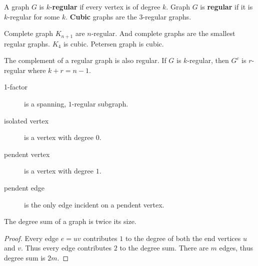 \begin{definition}
	A graph $G$ is $k$-\textbf{regular} if every vertex is of degree $k$. Graph $G$ is \textbf{regular} if it is $k$-regular for some $k$. \textbf{Cubic} graphs are the $3$-regular graphs.
\end{definition}
\begin{remark}
	Complete graph $K_{n+1}$ are $n$-regular.
	And complete graphs are the smallest regular graphs.
	$K_4$ is cubic.
	Petersen graph is cubic.
\end{remark}
\begin{figure}
\centering
{}
\end{figure}
\begin{remark}
	The complement of a regular graph is also regular. If $G$ is $k$-regular, then $G^c$ is $r$-regular where $k+r = n-1$.
\end{remark}
\begin{description}
	\item[1-factor] is a spanning, $1$-regular subgraph.
	\item[isolated vertex] is a vertex with degree $0$.
	\item[pendent vertex] is a vertex with degree $1$.
	\item[pendent edge] is the only edge incident on a pendent vertex.
\end{description}

\begin{theorem}[Euler]
	The degree sum of a graph is twice its size.
\end{theorem}
\begin{proof}
	Every edge $e= uv$ contributes $1$ to the degree of both the end vertices $u$ and $v$. Thus every edge contributes $2$ to the degree sum. There are $m$ edges, thus degree sum is $2m$.
\end{proof}

